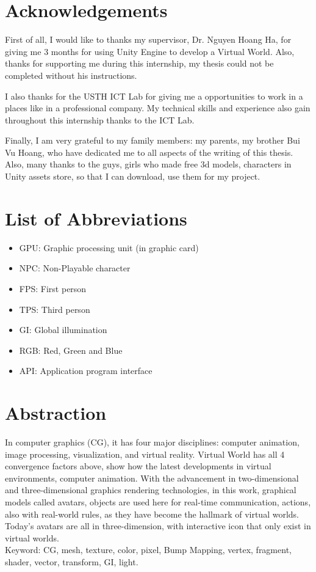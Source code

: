 \documentclass[a4paper, 13pt]{extarticle}
\begin{document}
\newpage
\section*{\color{cyan}\Large Acknowledgements}

First of all, I would like to thanks my supervisor, Dr. Nguyen Hoang Ha, for giving me 3 months for using  Unity Engine to develop a Virtual World. Also, thanks for supporting me during this internship, my thesis could not be completed without his instructions. 

I also thanks for the USTH ICT Lab for giving me a opportunities to work in a places like in a professional company. My technical skills and experience also gain throughout this internship thanks to the ICT Lab.

Finally, I am very grateful to my family members: my parents, my brother Bui Vu Hoang, who have dedicated me to all aspects of the writing of this thesis. Also, many thanks to the guys, girls who made free 3d models, characters in Unity assets store, so that I can download, use them for my project. 
\newpage
 
 \newpage
 \appendix
  \renewcommand{\thesubsection}{\Alph{section}}
 \renewcommand{\thesubsection}{\arabic{subsection}}
\section*{\Large List of Abbreviations} 
\begin{itemize}
	\item GPU: Graphic processing unit (in graphic card)
	\item NPC: Non-Playable character
	\item FPS: First person
	\item TPS: Third person
	\item GI: Global illumination	
	\item RGB: Red, Green and Blue
	\item API: Application program interface 
\end{itemize}
\newpage
\section{\Large Abstraction}
 In computer graphics (CG), it has four major disciplines: computer animation, image processing, visualization, and virtual reality. Virtual World has all 4 convergence factors above, show how the latest developments in virtual environments, computer animation. With the advancement in two-dimensional and three-dimensional graphics rendering technologies, in this work, graphical models called avatars, objects are used here for real-time communication, actions, also with real-world rules, as they have become the hallmark of virtual worlds. Today's avatars	are all in three-dimension, with interactive icon that only exist in virtual worlds. \\
 Keyword: CG, mesh, texture, color, pixel, Bump Mapping, vertex, fragment, shader, vector, transform, GI, light.
 
\end{document}

